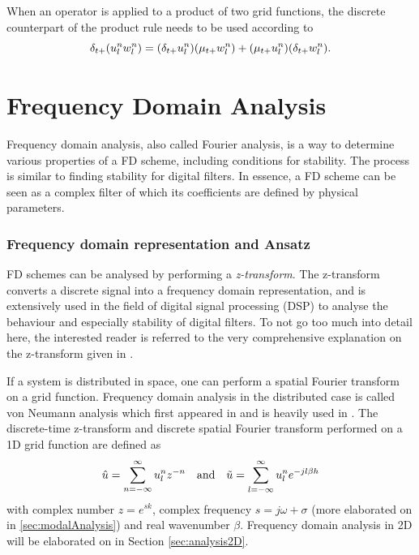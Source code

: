 When an operator is applied to a product of two grid functions, the discrete counterpart of the product rule needs to be used according to
\begin{equation}
    \delta_{t+} (u_l^nw_l^n) = (\delta_{t+} u_l^n)(\mu_{t+}w_l^n) + (\mu_{t+} u_l^n)(\delta_{t+} w_l^n).
\end{equation}

\section{Frequency Domain Analysis}\label{sec:stabilityAnalysis}
Frequency domain analysis, also called Fourier analysis, is a way to determine various properties of a FD scheme, including conditions for stability. The process is similar to finding stability for digital filters. In essence, a FD scheme can be seen as a complex filter of which its coefficients are defined by physical parameters. 

\subsubsection{Frequency domain representation and Ansatz}
FD schemes can be analysed by performing a \textit{z-transform}. The z-transform converts a discrete signal into a frequency domain representation, and is extensively used in the field of digital signal processing (DSP) to analyse the behaviour and especially stability of digital filters. To not go too much into detail here, the interested reader is referred to the very comprehensive explanation on the z-transform given in \cite[Ch. 5]{Park2010}. 

If a system is distributed in space, one can perform a spatial Fourier transform on a grid function. Frequency domain analysis in the distributed case is called von Neumann analysis which first appeared in \cite{Strikwerda1989} and is heavily used in \cite{theBible}. The discrete-time z-transform and discrete spatial Fourier transform performed on a 1D grid function are defined as \cite{theBible}
\begin{equation}
    \hat u  = \sum_{n=-\infty}^\infty u_l^n z^{-n}\quad \text{and} \quad \tilde u = \sum_{l=-\infty}^\infty u_l^n e^{-jl\beta h}
\end{equation}
with complex number $z = e^{sk}$, complex frequency $s=j\omega + \sigma$ (more elaborated on in \ref{sec:modalAnalysis}) and real wavenumber $\beta$. Frequency domain analysis in 2D will be elaborated on in Section \ref{sec:analysis2D}.


